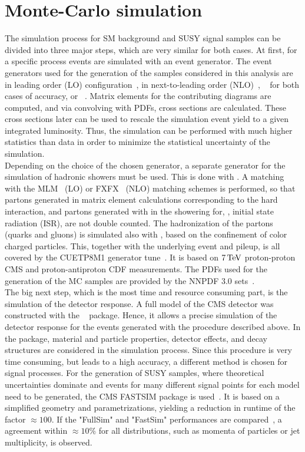\section{Monte-Carlo simulation}\label{sec:Simulation}
The simulation process for SM background and SUSY signal samples can be divided into three major steps, which are very similar for both cases. At first, for a specific process events are simulated with an event generator. The event generators used for the generation of the samples considered in this analysis are  in leading order (LO) configuration~\cite{Madgraph1,Madgraph2,Madgraph3}, \MADANDMC in next-to-leading order (NLO)~\cite{Madgraph1,AMCATNLO}, \PYTHIA~\cite{Pythia} for both cases of accuracy, or \POWHEG~\cite{Powheg1,Powheg2}. Matrix elements for the contributing diagrams are computed, and via convolving with PDFs, cross sections are calculated. These cross sections later can be used to rescale the simulation event yield to a given integrated luminosity. Thus, the simulation can be performed with much higher statistics than data in order to minimize the statistical uncertainty of the simulation.\\
Depending on the choice of the chosen generator, a separate generator for the simulation of hadronic showers must be used. This is done with \PYTHIA. A matching with the \textsc{MLM}~\cite{Madgraph2} (LO) or \textsc{FXFX}~\cite{AMCATNLO} (NLO) matching schemes is performed, so that partons generated in matrix element calculations corresponding to the hard interaction, and partons generated with \PYTHIA in the showering for, \eg, initial state radiation (ISR), are not double counted. The hadronization of the partons (quarks and gluons) is simulated also with \PYTHIA, based on the confinement of color charged particles.  This, together with the underlying event and pileup, is all covered by the \textsc{CUETP8M1} generator tune~\cite{Tune}. It is based on $7\,\text{Te\hspace{-.08em}V}$ proton-proton CMS and proton-antiproton CDF measurements. The PDFs used for the generation of the MC samples are provided by the \textsc{NNPDF} 3.0 sets~\cite{NNPDF}.\\
The big next step, which is the most time and resource consuming part, is the simulation of the detector response. A full model of the CMS detector was constructed with the \GEANTfour~\cite{Geant} package. Hence, it allows a precise simulation of the detector response for the events generated with the procedure described above. In the \GEANTfour package, material and particle properties, detector effects, and decay structures are considered in the simulation process. Since this procedure is very time consuming, but leads to a high accuracy, a different method is chosen for signal processes. For the generation of SUSY samples, where theoretical uncertainties dominate and events for many different signal points for each model need to be generated, the CMS \textsc{FASTSIM} package is used~\cite{FastSim}. It is based on a simplified geometry and parametrizations, yielding a reduction in runtime of the factor $\approx100$. If the "FullSim" and "FastSim" performances are compared~\cite{FastSimQuality}, a agreement within $\approx10\%$ for all distributions, such as momenta of particles or jet multiplicity, is observed.\\
